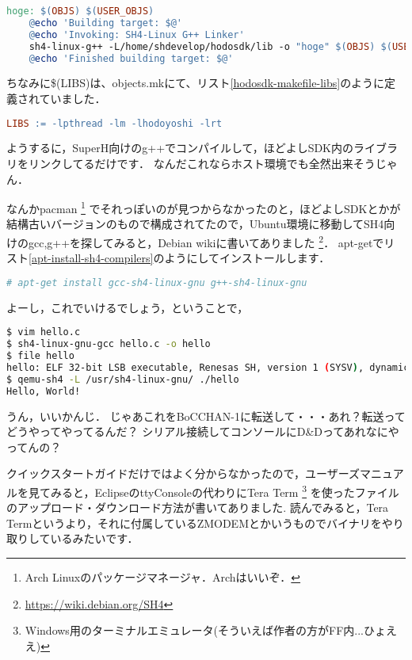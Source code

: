 \begin{lstlisting}[language=make,label=hodosdk-makefile-main,caption=makefile(リンク部分)]
hoge: $(OBJS) $(USER_OBJS)
    @echo 'Building target: $@'
    @echo 'Invoking: SH4-Linux G++ Linker'
    sh4-linux-g++ -L/home/shdevelop/hodosdk/lib -o "hoge" $(OBJS) $(USER_OBJS) $(LIBS)
    @echo 'Finished building target: $@'
\end{lstlisting}

ちなみに\$(LIBS)は、objects.mkにて、リスト\ref{hodosdk-makefile-libs}のように定義されていました．

\begin{lstlisting}[language=make,label=hodosdk-makefile-libs,caption=\$(LIBS)の定義]
LIBS := -lpthread -lm -lhodoyoshi -lrt
\end{lstlisting}

ようするに，SuperH向けのg++でコンパイルして，ほどよしSDK内のライブラリをリンクしてるだけです．
なんだこれならホスト環境でも全然出来そうじゃん．

なんかpacman
\footnote{Arch Linuxのパッケージマネージャ．Archはいいぞ．}
でそれっぽいのが見つからなかったのと，ほどよしSDKとかが結構古いバージョンのもので構成されてたので，Ubuntu環境に移動してSH4向けのgcc,g++を探してみると，Debian wikiに書いてありました \footnote{\url{https://wiki.debian.org/SH4}}．
apt-getでリスト\ref{apt-install-sh4-compilers}のようにしてインストールします．

\begin{lstlisting}[language=bash,label=apt-install-sh4-compilers]
# apt-get install gcc-sh4-linux-gnu g++-sh4-linux-gnu
\end{lstlisting}

\newpage
よーし，これでいけるでしょう，ということで，
\begin{lstlisting}[language=bash,caption=sh4-linux-gnuでコンパイル，qemuでテスト実行]
$ vim hello.c
$ sh4-linux-gnu-gcc hello.c -o hello
$ file hello
hello: ELF 32-bit LSB executable, Renesas SH, version 1 (SYSV), dynamically linked, interpreter /lib/ld-linux.so.2, BuildID[sha1]=..., for GNU/Linux 3.2.0, not stripped
$ qemu-sh4 -L /usr/sh4-linux-gnu/ ./hello
Hello, World!
\end{lstlisting}

うん，いいかんじ．
じゃあこれをBoCCHAN-1に転送して・・・あれ？転送ってどうやってやってるんだ？
シリアル接続してコンソールにD\&Dってあれなにやってんの？

クイックスタートガイドだけではよく分からなかったので，ユーザーズマニュアルを見てみると，EclipseのttyConsoleの代わりにTera Term
\footnote{Windows用のターミナルエミュレータ(そういえば作者の方がFF内...ひょええ)}
を使ったファイルのアップロード・ダウンロード方法が書いてありました.
読んでみると，Tera Termというより，それに付属しているZMODEMとかいうものでバイナリをやり取りしているみたいです．

